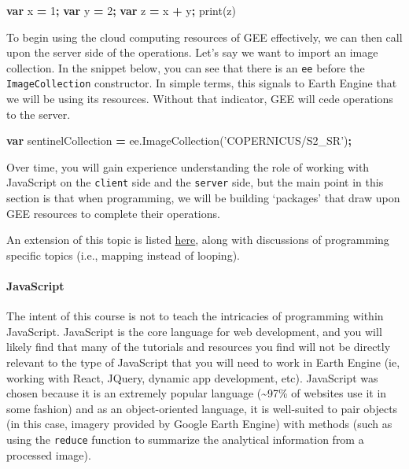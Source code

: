 \documentclass[
]{article}
\newenvironment{Shaded}{\begin{snugshade}}{\end{snugshade}}
\newcommand{\AttributeTok}[1]{\textcolor[rgb]{0.77,0.63,0.00}{#1}}
\newcommand{\DecValTok}[1]{\textcolor[rgb]{0.00,0.00,0.81}{#1}}
\newcommand{\KeywordTok}[1]{\textcolor[rgb]{0.13,0.29,0.53}{\textbf{#1}}}
\newcommand{\NormalTok}[1]{#1}
\newcommand{\OperatorTok}[1]{\textcolor[rgb]{0.81,0.36,0.00}{\textbf{#1}}}
\newcommand{\StringTok}[1]{\textcolor[rgb]{0.31,0.60,0.02}{#1}}
\newcommand{\VariableTok}[1]{\textcolor[rgb]{0.00,0.00,0.00}{#1}}
\begin{document}
\begin{Shaded}
\begin{Highlighting}[]
\KeywordTok{var}\NormalTok{ x }\OperatorTok{=} \DecValTok{1}\OperatorTok{;} \KeywordTok{var}\NormalTok{ y }\OperatorTok{=} \DecValTok{2}\OperatorTok{;}
\KeywordTok{var}\NormalTok{ z }\OperatorTok{=}\NormalTok{ x }\OperatorTok{+}\NormalTok{ y}\OperatorTok{;}
\AttributeTok{print}\NormalTok{(z)}
\end{Highlighting}
\end{Shaded}

To begin using the cloud computing resources of GEE effectively, we can then call upon the server side of the operations. Let's say we want to import an image collection. In the snippet below, you can see that there is an \texttt{ee} before the \texttt{ImageCollection} constructor. In simple terms, this signals to Earth Engine that we will be using its resources. Without that indicator, GEE will cede operations to the server.

\begin{Shaded}
\begin{Highlighting}[]
\KeywordTok{var}\NormalTok{ sentinelCollection }\OperatorTok{=} \VariableTok{ee}\NormalTok{.}\AttributeTok{ImageCollection}\NormalTok{(}\StringTok{'COPERNICUS/S2_SR'}\NormalTok{)}\OperatorTok{;}
\end{Highlighting}
\end{Shaded}

Over time, you will gain experience understanding the role of working with JavaScript on the \texttt{client} side and the \texttt{server} side, but the main point in this section is that when programming, we will be building `packages' that draw upon GEE resources to complete their operations.

An extension of this topic is listed \href{https://developers.google.com/earth-engine/guides/client_server}{here}, along with discussions of programming specific topics (i.e., mapping instead of looping).

\hypertarget{javascript}{%
\paragraph{JavaScript}\label{javascript}}

The intent of this course is not to teach the intricacies of programming within JavaScript. JavaScript is the core language for web development, and you will likely find that many of the tutorials and resources you find will not be directly relevant to the type of JavaScript that you will need to work in Earth Engine (ie, working with React, JQuery, dynamic app development, etc). JavaScript was chosen because it is an extremely popular language (\textasciitilde97\% of websites use it in some fashion) and as an object-oriented language, it is well-suited to pair objects (in this case, imagery provided by Google Earth Engine) with methods (such as using the \texttt{reduce} function to summarize the analytical information from a processed image).
\end{document}
